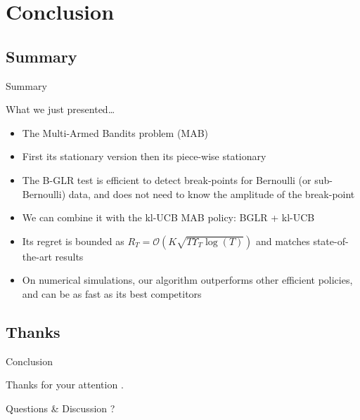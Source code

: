 \documentclass[11pt,english,ignorenonframetext,]{beamer}
\newcommand{\Fontify}{}
\begin{document}
\section{\hfill{}Conclusion\hfill{}}
\subsection{Summary}

\begin{frame}{Summary}

  What we just presented\ldots{}
  \begin{itemize}
    \item
    The Multi-Armed Bandits problem (MAB)
    \item
    First its stationary version then its \alert{piece-wise stationary}
    \item
    The B-GLR test is efficient to detect break-points for Bernoulli (or sub-Bernoulli) data,
    and does not need to know the amplitude of the break-point
    \item
    We can combine it with the kl-UCB MAB policy:
    \alert{BGLR + kl-UCB}
    \item
    Its regret is bounded as $R_T = \mathcal{O}(K \sqrt{T \Upsilon_T \log(T)})$ and matches state-of-the-art results
    \item
    On numerical simulations, our algorithm outperforms other efficient policies, and can be as fast as its best competitors
  \end{itemize}

\end{frame}

\subsection{Thanks}
\begin{frame}{Conclusion}

\begin{center}
  \begin{Large}
    {\Fontify Thanks for your attention .}
    \Smiley[0.9]
  \end{Large}
\end{center}

\begin{center}
  \begin{Large}
    Questions \& Discussion ?
  \end{Large}
\end{center}

\end{frame}
\end{document}
